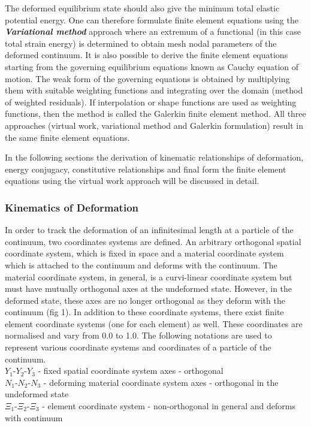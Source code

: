 The deformed equilibrium state should also give the minimum total elastic
potential energy. One can therefore formulate finite element equations using
the \textit{\textbf{Variational method}} approach where an extremum of a
functional (in this case total strain energy) is determined to obtain mesh
nodal parameters of the deformed continuum. It is also possible to derive the
finite element equations starting from the governing equilibrium equations
known as Cauchy equation of motion. The weak form of the governing equations
is obtained by multiplying them with suitable weighting functions and
integrating over the domain (method of weighted residuals). If interpolation
or shape functions are used as weighting functions, then the method is called
the Galerkin finite element method. All three approaches (virtual work,
variational method and Galerkin formulation) result in the same finite element
equations.

In the following sections the derivation of kinematic relationships of
deformation, energy conjugacy, constitutive relationships and final form the
finite element equations using the virtual work approach will be discussed in
detail.

\subsubsection{Kinematics of Deformation}
In order to track the deformation of an infinitesimal length at a particle of
the continuum, two coordinates systems are defined. An arbitrary orthogonal
spatial coordinate system, which is fixed in space and a material coordinate
system which is attached to the continuum and deforms with the continuum. The
material coordinate system, in general, is a curvi-linear coordinate system
but must have mutually orthogonal axes at the undeformed state. However, in
the deformed state, these axes are no longer orthogonal as they deform with
the continuum (fig 1). In addition to these coordinate systems, there exist
finite element coordinate systems (one for each element) as well. These
coordinates are normalised and vary from 0.0 to 1.0. The following notations are used to represent various coordinate systems and coordinates of a particle of the continuum.\\

\noindent $Y_{1}$-$Y_{2}$-$Y_{3}$ - fixed spatial coordinate system axes - orthogonal\\
$N_{1}$-$N_{2}$-$N_{3}$ - deforming material coordinate system axes  - orthogonal in the undeformed state\\
$\Xi_{1}$-$\Xi_{2}$-$\Xi_{3}$ - element coordinate system - non-orthogonal in general and deforms with continuum\\

